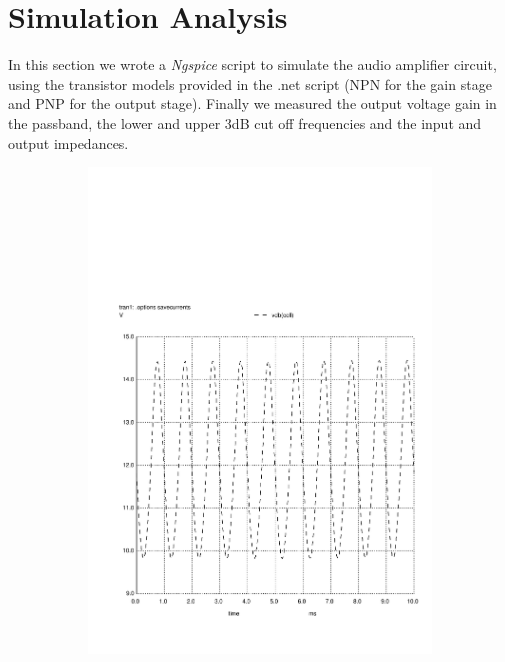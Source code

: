 \section{Simulation Analysis}
\label{sec:simulation}

In this section we wrote a \textit{Ngspice} script to simulate the audio
amplifier circuit, using the transistor models provided in the .net script 
(NPN for the gain stage and PNP for the output stage).
Finally we measured the output voltage gain in the passband, 
the lower and upper 3dB cut off frequencies and the input and output 
impedances.





\begin{figure}[h]
  \centering
  \begin{subfigure}{0.23\textwidth}
    \includegraphics[width=\linewidth, clip]{vo1.pdf}

\end{subfigure}
\end{figure}
